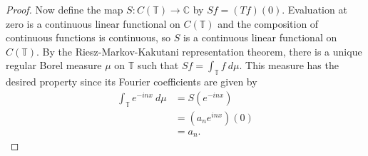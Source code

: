 \documentclass[11pt,letterpaper]{report}
\newcommand{\complex}{\mathbb{C}}
\newcommand{\torus}{\mathbb{T}}
\begin{document}
\begin{proof}
	\noindent Now define the map $S: C(\torus)\to \complex$ by $Sf = (Tf)(0)$. Evaluation at zero is a continuous linear functional on $C(\torus)$ and the composition of continuous functions is continuous, so $S$ is a continuous linear functional on $C(\torus)$. By the Riesz-Markov-Kakutani representation theorem, there is a unique regular Borel measure $\mu$ on $\torus$ such that $Sf = \int_\torus f\ d\mu$. This measure has the desired property since its Fourier coefficients are given by
	\begin{align*}
		\int_\torus e^{-inx}\ d\mu &= S(e^{-inx})\\
		&= (a_ne^{inx})(0)\\
		&= a_n.
	\end{align*}
\end{proof}
\end{document}
